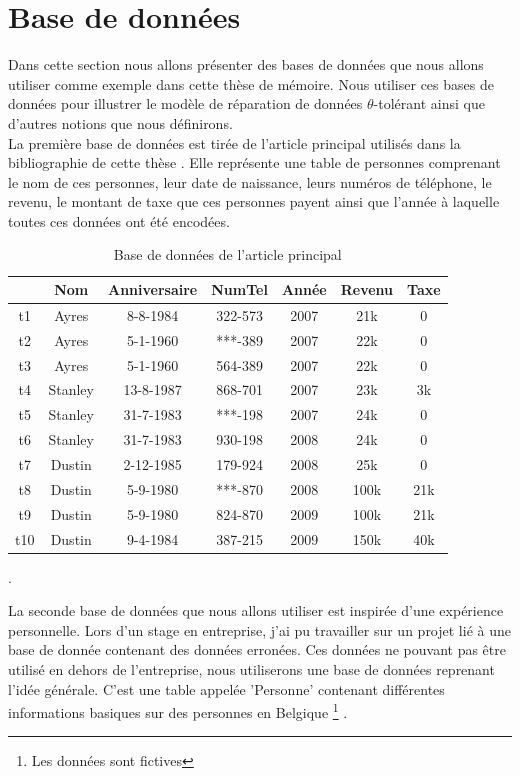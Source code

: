 \documentclass[letterpaper, 12pt]{report}
\theoremstyle{definition}
\newcommand{\alinea}{
\hspace*{0.5cm}}
\begin{document}
\section{Base de données}

\alinea Dans cette section nous allons présenter des bases de données que nous allons utiliser comme exemple dans cette thèse de mémoire. Nous utiliser ces bases de données pour illustrer le modèle de réparation de données $\theta$-tolérant ainsi que d'autres notions que nous définirons.\\

La première base de données est tirée de l'article principal utilisés dans la bibliographie de cette thèse \cite{main}. Elle représente une table de personnes comprenant le nom de ces personnes, leur date de naissance, leurs numéros de téléphone, le revenu, le montant de taxe que ces personnes payent ainsi que l'année à laquelle toutes ces données ont été encodées.

\begin{table}[H]
	\centering
	\begin{tabular}{|c|c c c c c c|}
	\hline
	    & Nom & Anniversaire & NumTel & Année & Revenu & Taxe\\
	\hline
	 t1 & Ayres & 8-8-1984 & 322-573 & 2007 & 21k & 0\\
	 t2 & Ayres & 5-1-1960 & ***-389 & 2007 & 22k & 0 \\
	 t3 & Ayres & 5-1-1960 & 564-389 & 2007 & 22k & 0 \\
	 t4 & Stanley & 13-8-1987 & 868-701 & 2007 & 23k & 3k\\
	 t5 & Stanley & 31-7-1983 & ***-198 & 2007 & 24k & 0\\
	 t6 & Stanley & 31-7-1983 & 930-198 & 2008 & 24k & 0\\
	 t7 & Dustin & 2-12-1985 & 179-924 & 2008 & 25k & 0 \\
	 t8 & Dustin & 5-9-1980 & ***-870 & 2008 & 100k & 21k \\
	 t9 & Dustin & 5-9-1980 & 824-870 & 2009 & 100k & 21k \\
	 t10 & Dustin & 9-4-1984 & 387-215 & 2009 & 150k & 40k \\
	 \hline
	\end{tabular}
	\caption{\label{tableMain} Base de données de l'article principal \cite{main}}.
\end{table}

La seconde base de données que nous allons utiliser est inspirée d'une expérience personnelle. Lors d'un stage en entreprise, j'ai pu travailler sur un projet lié à une base de donnée contenant des données erronées. Ces données ne pouvant pas être utilisé en dehors de l'entreprise, nous utiliserons une base de données reprenant l'idée générale. C'est une table appelée 'Personne' contenant différentes informations basiques sur des personnes en Belgique \footnote{Les données sont fictives} . 
\end{document}
